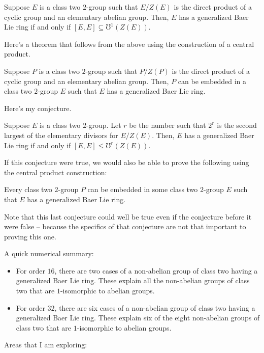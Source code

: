 \documentclass[10pt]{amsart}
\begin{document}
\begin{theorem}
  Suppose $E$ is a class two $2$-group such that $E/Z(E)$ is the
  direct product of a cyclic group and an elementary abelian
  group. Then, $E$ has a generalized Baer Lie ring if and only if
  $[E,E] \subseteq \mho^1(Z(E))$.
\end{theorem}

Here's a theorem that follows from the above using the construction of
a central product.

\begin{theorem}\label{embedding}
  Suppose $P$ is a class two $2$-group such that $P/Z(P)$ is the
  direct product of a cyclic group and an elementary abelian
  group. Then, $P$ can be embedded in a class two $2$-group $E$ such
  that $E$ has a generalized Baer Lie ring.
\end{theorem}

Here's my conjecture.

\begin{conjecture}
  Suppose $E$ is a class two $2$-group. Let $r$ be the number such
  that $2^r$ is the second largest of the elementary divisors for
  $E/Z(E)$. Then, $E$ has a generalized Baer Lie ring if and only if
  $[E,E] \le \mho^r(Z(E))$.
\end{conjecture}

If this conjecture were true, we would also be able to prove the
following using the central product construction:

\begin{conjecture}
  Every class two $2$-group $P$ can be embedded in some class two
  $2$-group $E$ such that $E$ has a generalized Baer Lie ring.
\end{conjecture}

Note that this last conjecture could well be true even if the
conjecture before it were false -- because the specifics of that
conjecture are not that important to proving this one.

A quick numerical summary:

\begin{itemize}
\item For order $16$, there are two cases of a non-abelian group of
  class two having a generalized Baer Lie ring. These explain all the
  non-abelian groups of class two that are $1$-isomorphic to abelian
  groups.
\item For order $32$, there are six cases of a non-abelian group of
  class two having a generalized Baer Lie ring. These explain six of
  the eight non-abelian groups of class two that are $1$-isomorphic to
  abelian groups.
\end{itemize}
Areas that I am exploring:
\end{document}
